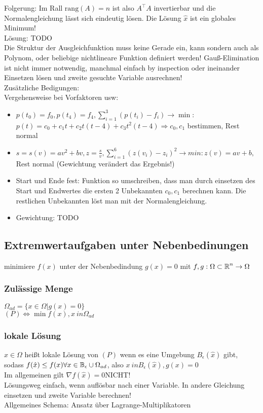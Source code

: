 \documentclass[german]{latex4ei/latex4ei_sheet}
\begin{document}
Folgerung: Im Rall $\mathrm{rang}(A)=n$ ist also $A^\top A$ invertierbar und die Normalengleichung l\"asst sich eindeutig l\"osen. Die L\"osung $\hat{x}$ ist ein globales Minimum!\\
L\"osung: TODO\\
Die Struktur der Ausgleichfunktion muss keine Gerade ein, kann sondern auch als Polynom, oder beliebige nichtlineare Funktion definiert werden! Gau\ss{}-Elimination ist nicht immer notwendig, manchmal einfach by inspection oder ineinander Einsetzen l\"osen und zweite gesuchte Variable ausrechnen!\\
Zus\"atzliche Bedigungen:\\
Vergehensweise bei Vorfaktoren usw: 
\begin{itemize}
\item $p(t_0)=f_0, p(t_4)=f_4, \sum_{i=1}^3(p(t_i)-f_i) \rightarrow \min$: $p(t)=c_0+c_1 t + c_2 t(t-4)+c_3 t^2 (t-4) \Rightarrow c_0,c_1$ bestimmen, Rest normal
\item $s=s(v)=a v^2 +b v, z=\frac{s}{v}, \sum_{i=1}^6 (z(v_i)-z_i)^2 \rightarrow min: z(v)=a v + b,$ Rest normal (Gewichtung ver\"andert das Ergebnis!)
\end{itemize}
\begin{itemize}
\item Start und Ende fest: Funktion so umschreiben, dass man durch einsetzen des Start und Endwertes die ersten 2 Unbekannten $c_0,c_1$ berechnen kann. Die restlichen Unbekannten l\"ost man mit der Normalengleichung.
\item Gewichtung: TODO
\end{itemize}

\subsection{Extremwertaufgaben unter Nebenbedinungen}
minimiere $f(x)$ unter der Nebenbedindung $g(x)=0$ mit $f,g:\Omega \subset \operatorname{\mathbb R}^n \to \Omega$

\subsubsection{Zul\"assige Menge}
$\Omega_{ad}=\{x \in \Omega | g(x)=0\}$\\
$(P) \Leftrightarrow \min f(x), x\ in \Omega_{ad}$\\

\subsubsection{lokale L\"osung}
$\hat{x} \in \Omega$ hei\ss{}t lokale L\"osung von $(P)$ wenn es eine Umgebung $B_\epsilon(\hat{x})$ gibt, sodass $f(\hat{x})\le f(x) \forall x \in \mathbb B_\epsilon \cup \Omega_{ad}$, also $x\ in B_\epsilon(\hat{x}), g(x)=0$\\
Im allgemeinen gilt $\nabla f(\hat{x})=0 $NICHT!\\
L\"osungsweg einfach, wenn aufl\"osbar nach einer Variable. In andere Gleichung einsetzen und zweite Variable berechnen!\\
Allgemeines Schema: Ansatz \"uber Lagrange-Multiplikatoren\\
\end{document}

